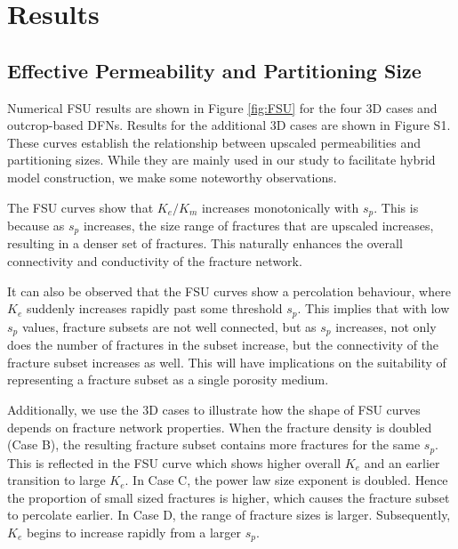 \documentclass[draft]{agujournal2018}
\begin{document}
\section{Results}
\subsection{Effective Permeability and Partitioning Size}
Numerical FSU results are shown in Figure \ref{fig:FSU} for the four 3D cases and outcrop-based DFNs. Results for the additional 3D cases are shown in Figure S1. These curves establish the relationship between upscaled permeabilities and partitioning sizes. While they are mainly used in our study to facilitate hybrid model construction, we make some noteworthy observations.

The FSU curves show that $K_e/K_m$ increases monotonically with $s_p$. This is because as $s_p$ increases, the size range of fractures that are upscaled increases, resulting in a denser set of fractures. This naturally enhances the overall connectivity and conductivity of the fracture network.

It can also be observed that the FSU curves show a percolation behaviour, where $K_e$ suddenly increases rapidly past some threshold $s_p$. This implies that with low $s_p$ values, fracture subsets are not well connected, but as $s_p$ increases, not only does the number of fractures in the subset increase, but the connectivity of the fracture subset increases as well. This will have implications on the suitability of representing a fracture subset as a single porosity medium.

Additionally, we use the 3D cases to illustrate how the shape of FSU curves depends on fracture network properties. When the fracture density is doubled (Case B), the resulting fracture subset contains more fractures for the same $s_p$. This is reflected in the FSU curve which shows higher overall $K_e$ and an earlier transition to large $K_e$. In Case C, the power law size exponent is doubled. Hence the proportion of small sized fractures is higher, which causes the fracture subset to percolate earlier. In Case D, the range of fracture sizes is larger. Subsequently, $K_e$ begins to increase rapidly from a larger $s_p$.
\end{document}
